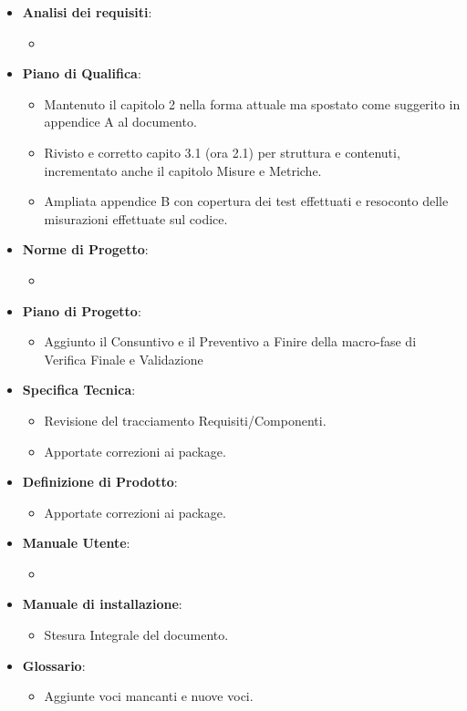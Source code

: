 \begin{itemize}
	\item \textbf{Analisi dei requisiti}:
	\begin{itemize}
		\item 
	\end{itemize}
	\item \textbf{Piano di Qualifica}:
	\begin{itemize}
		\item Mantenuto il capitolo 2 nella forma attuale ma spostato come suggerito in appendice A al documento.
		\item Rivisto e corretto capito 3.1 (ora 2.1) per struttura e contenuti, incrementato anche il capitolo Misure e Metriche.
		\item Ampliata appendice B con copertura dei test effettuati e resoconto delle misurazioni effettuate sul codice.
	\end{itemize}
	\item \textbf{Norme di Progetto}:
	\begin{itemize}
		\item 
	\end{itemize}
	\item \textbf{Piano di Progetto}:
	\begin{itemize}
		\item Aggiunto il Consuntivo e il Preventivo a Finire della macro-fase di Verifica Finale e Validazione
	\end{itemize}	
	\item \textbf{Specifica Tecnica}:
	\begin{itemize}
		\item Revisione del tracciamento Requisiti/Componenti.
		\item Apportate correzioni ai package.
	\end{itemize}
	\item \textbf{Definizione di Prodotto}:
	\begin{itemize}
		\item Apportate correzioni ai package.
	\end{itemize}
	\item \textbf{Manuale Utente}:
	\begin{itemize}
		\item 
	\end{itemize}
	\item \textbf{Manuale di installazione}:
	\begin{itemize}
		\item  Stesura Integrale del documento.
	\end{itemize}	
	\item \textbf{Glossario}:
	\begin{itemize}
		\item Aggiunte voci mancanti e nuove voci.
	\end{itemize}
\end{itemize}